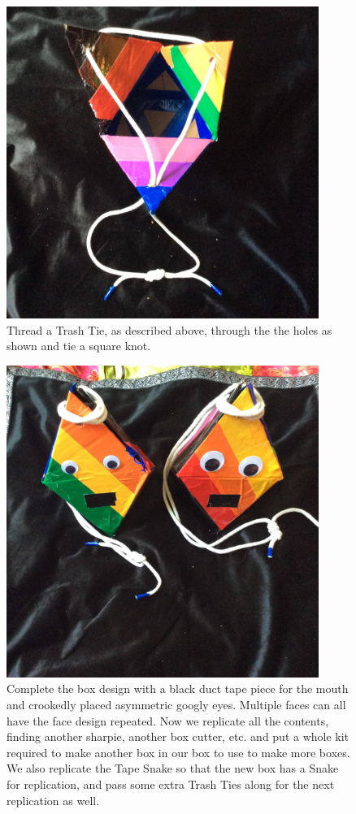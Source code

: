 \begin{figure}
	\centering
	\includegraphics[width=4in]{figures/artboxtie.jpg}
	\caption[artboxtie]
	{Thread a Trash Tie, as described above, through the the holes as shown and tie a square knot.}
\end{figure}

\begin{figure}
	\centering
	\includegraphics[width=4in]{figures/artboxcopy.jpg}
	\caption[artboxcopy]
	{Complete the box design with a black duct tape piece for the mouth and crookedly placed asymmetric googly eyes.  Multiple faces can all have the face design repeated.  Now we replicate all the contents, finding another sharpie, another box cutter, etc. and put a whole kit required to make another box in our box to use to make more boxes.  We also replicate the Tape Snake so that the new box has a Snake for replication, and pass some extra Trash Ties along for the next replication as well.}
\end{figure}

